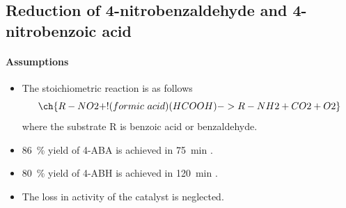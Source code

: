 

\subsection{Reduction of 4-nitrobenzaldehyde and 4-nitrobenzoic acid}
\paragraph{Assumptions}
\begin{itemize}
    \item The stoichiometric reaction is as follows \cite{gowda_catalytic_2000}
    \begin{equation}
        \ch{R-NO2 +  !( formic~acid )( HCOOH ) -> R-NH2 + CO2 + O2}
    \end{equation}
    where the substrate R is benzoic acid or benzaldehyde.
    \item \SI{86}{\percent} yield of 4-ABA is achieved in \SI{75}{\minute} \cite{gowda_catalytic_2000}.
     \item \SI{80}{\percent} yield of 4-ABH is achieved in \SI{120}{\minute} \cite{gowda_catalytic_2000}.
    \item The loss in activity of the catalyst is neglected.
\end{itemize}